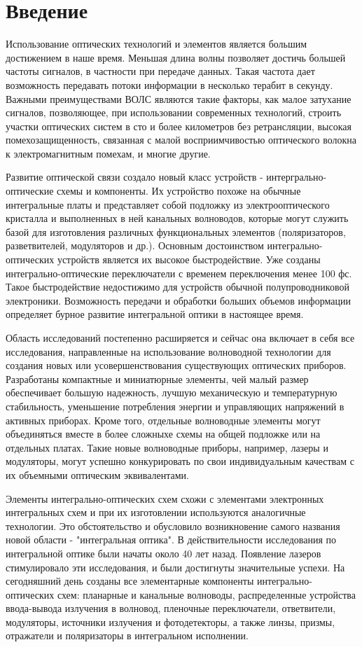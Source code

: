 \section*{Введение}
Использование оптических технологий и элементов является большим достижением в наше время. Меньшая длина волны позволяет достичь большей частоты сигналов, в частности при передаче данных. Такая частота дает возможность передавать потоки информации в несколько терабит в секунду. Важными преимуществами ВОЛС являются такие факторы, как малое затухание сигналов, позволяющее, при использовании современных технологий, строить участки оптических систем в сто и более километров без ретрансляции, высокая помехозащищенность, связанная с малой восприимчивостью оптического волокна к электромагнитным помехам, и многие другие.

Развитие оптической связи создало новый класс устройств - интергрально-оптические схемы и компоненты. Их устройство похоже на обычные интегральные платы и представляет собой подложку из электрооптического кристалла и выполненных в ней канальных волноводов, которые могут служить базой для изготовления различных функциональных элементов  (поляризаторов, разветвителей, модуляторов и др.). Основным достоинством интегрально-оптических устройств является их высокое быстродействие. Уже созданы интегрально-оптические  переключатели с временем переключения менее 100 фс. Такое быстродействие недостижимо для устройств обычной полупроводниковой электроники. Возможность передачи и обработки больших объемов информации определяет бурное развитие интегральной оптики в настоящее время.

Область исследований постепенно расширяется и сейчас она включает в себя все исследования, направленные на использование волноводной технологии для создания новых или усовершенствования существующих оптических приборов. Разработаны компактные и миниатюрные элементы, чей малый размер обеспечивает большую надежность, лучшую механическую и температурную стабильность, уменьшение потребления энергии и управляющих напряжений в активных приборах. Кроме того, отдельные волноводные элементы могут объединяться вместе в более сложныхе схемы на общей подложке или на отдельных платах. Такие новые волноводные приборы, например, лазеры и модуляторы, могут успешно конкурировать по свои индивидуальным качествам с их объемными оптическим эквивалентами.

Элементы интегрально-оптических схем схожи с элементами электронных интегральных схем и при их изготовлении используются аналогичные тех\-нологии. Это обстоятельство и обусловило возникновение самого названия новой области - "интегральная оптика". В действительности исследования по интегральной оптике были начаты около 40 лет назад. Появление лазеров стимулировало эти исследования, и были достигнуты значительные успехи. На сегодняшний день созданы все элементарные компоненты интегрально-оптических схем: планарные и канальные волноводы, распределенные устройства ввода-вывода излучения в волновод, пленочные переключатели, ответвители, модуляторы, источники излучения и фотодетекторы, а также линзы, призмы, отражатели и поляризаторы в интегральном исполнении.

